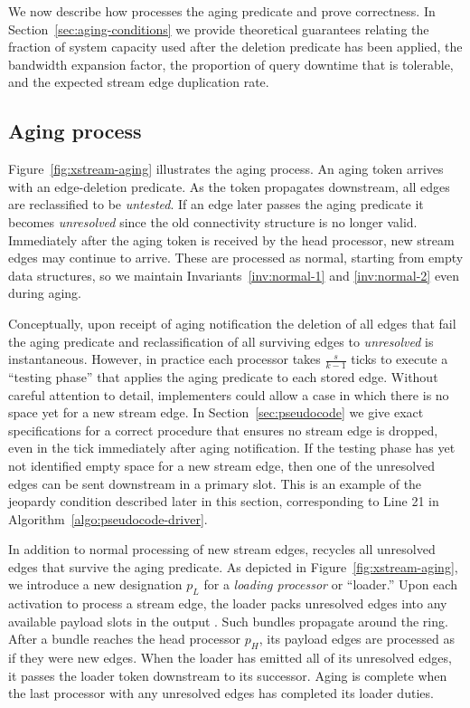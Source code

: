 We now describe how \XSCC processes the aging predicate and prove correctness.
In Section~\ref{sec:aging-conditions} we provide theoretical guarantees relating 
the fraction of
system capacity used after the deletion predicate has been applied, the 
bandwidth expansion
factor, the proportion of query downtime that is tolerable, and the 
expected stream edge duplication rate.

\subsection{Aging process}
\label{sec:aging-process}
Figure~\ref{fig:xstream-aging} illustrates the aging process. An aging token arrives
with an edge-deletion predicate.  As the token propagates downstream, all
edges are reclassified to be \emph{untested}. If an edge later passes the
aging predicate it becomes \emph{unresolved} since the old connectivity
structure is no longer valid.
Immediately after the aging token is received
by the head processor, new stream edges may continue to arrive. These are
processed as normal, starting from empty data structures, so we maintain 
Invariants~\ref{inv:normal-1} and \ref{inv:normal-2} even during aging.

Conceptually, upon receipt of aging notification the deletion of all
edges that fail the aging predicate and
reclassification of all surviving edges to \emph{unresolved} is instantaneous.
However, in
practice each processor takes $\frac{s}{k-1}$ \XStream ticks to execute
a ``testing phase'' that applies the aging predicate to each stored
edge.  Without careful attention to detail,
implementers could allow a case in which there is no space yet for a new
stream edge.  In Section~\ref{sec:pseudocode} we give exact
specifications for a correct procedure that ensures no stream edge is
dropped, even in the \XStream tick immediately after aging notification.
If the testing phase has yet not identified empty space for a new stream
edge, then one of the unresolved edges can be sent downstream
in a primary slot.  This is an example of the jeopardy condition described
later in this section, corresponding to Line 21 in Algorithm~\ref{algo:pseudocode-driver}.

In addition to normal processing of new stream edges, \XSCC recycles all
unresolved edges that survive the aging predicate.
As depicted in Figure~\ref{fig:xstream-aging}, we introduce a new designation $p_L$
for a \emph{loading processor} or ``loader.''  Upon each activation to process
a stream edge, the loader packs unresolved edges into any available payload
slots in the output \bundlens.  Such bundles propagate around the ring. After
a bundle
reaches the head processor $p_H$, its payload edges are processed as if they
were new edges.  When the loader has emitted all of its unresolved edges, it
passes the loader token downstream to its successor.  Aging is complete when
the last processor with any unresolved edges has completed its loader duties.

